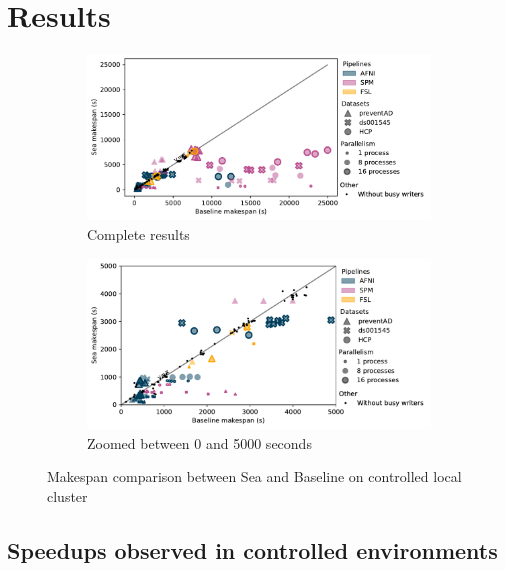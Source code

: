     \section{Results}


\begin{figure}

\begin{subfigure}{\textwidth}
    \centering
    \captionsetup{width=.85\linewidth}
    \includegraphics[width=\columnwidth]{figures/sea-neuro/slashbin_results.pdf}%
    \caption{Complete results}\label{fig:seaneuro:slashbinfull}
\end{subfigure}
\begin{subfigure}{\textwidth}
    \centering
    \captionsetup{width=.85\linewidth}
    \includegraphics[width=\linewidth]{figures/sea-neuro/slashbin_results_zoomed.pdf}
    \caption{Zoomed between 0 and 5000 seconds}\label{fig:seaneuro:slashbinzoom}
\end{subfigure}
\caption{Makespan comparison between Sea and Baseline on controlled local cluster}
\label{fig:seaneuro:slashbin}
\end{figure}

\subsection{Speedups observed in controlled environments}

